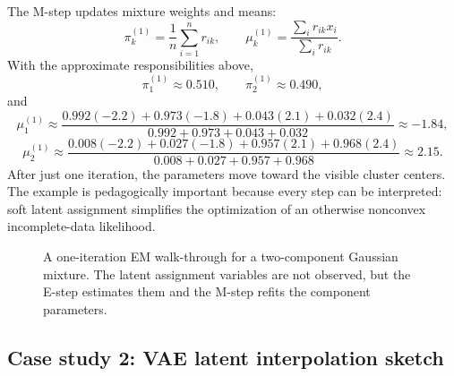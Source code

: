 The M-step updates mixture weights and means:
\[
\pi_k^{(1)}=\frac{1}{n}\sum_{i=1}^n r_{ik},
\qquad
\mu_k^{(1)}=\frac{\sum_i r_{ik}x_i}{\sum_i r_{ik}}.
\]
With the approximate responsibilities above,
\[
\pi_1^{(1)}\approx 0.510,
\qquad
\pi_2^{(1)}\approx 0.490,
\]
and
\[
\mu_1^{(1)}
\approx
\frac{0.992(-2.2)+0.973(-1.8)+0.043(2.1)+0.032(2.4)}{0.992+0.973+0.043+0.032}
\approx -1.84,
\]
\[
\mu_2^{(1)}
\approx
\frac{0.008(-2.2)+0.027(-1.8)+0.957(2.1)+0.968(2.4)}{0.008+0.027+0.957+0.968}
\approx 2.15.
\]
After just one iteration, the parameters move toward the visible cluster centers.
The example is pedagogically important because every step can be interpreted:
soft latent assignment simplifies the optimization of an otherwise nonconvex incomplete-data likelihood.

\begin{figure}[h]
\centering
{}
\caption{A one-iteration EM walk-through for a two-component Gaussian mixture. The latent assignment variables are not observed, but the E-step estimates them and the M-step refits the component parameters.}
\label{fig:emwalkthrough}
\end{figure}

\subsection*{Case study 2: VAE latent interpolation sketch}

